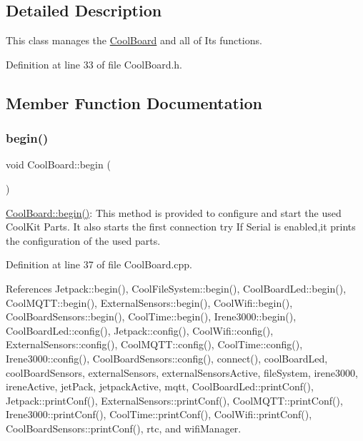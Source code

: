 \subsection{Detailed Description}
This class manages the \hyperlink{classCoolBoard}{Cool\+Board} and all of Its functions. 

Definition at line 33 of file Cool\+Board.\+h.



\subsection{Member Function Documentation}
\mbox{\label{classCoolBoard_acba7c5aef7268b2c0044bdb54d3b9d76}} 
\subsubsection{\texorpdfstring{begin()}{begin()}}
{\footnotesize\ttfamily void Cool\+Board\+::begin (\begin{DoxyParamCaption}{ }\end{DoxyParamCaption})}

\hyperlink{classCoolBoard_acba7c5aef7268b2c0044bdb54d3b9d76}{Cool\+Board\+::begin()}\+: This method is provided to configure and start the used Cool\+Kit Parts. It also starts the first connection try If Serial is enabled,it prints the configuration of the used parts. 

Definition at line 37 of file Cool\+Board.\+cpp.



References Jetpack\+::begin(), Cool\+File\+System\+::begin(), Cool\+Board\+Led\+::begin(), Cool\+M\+Q\+T\+T\+::begin(), External\+Sensors\+::begin(), Cool\+Wifi\+::begin(), Cool\+Board\+Sensors\+::begin(), Cool\+Time\+::begin(), Irene3000\+::begin(), Cool\+Board\+Led\+::config(), Jetpack\+::config(), Cool\+Wifi\+::config(), External\+Sensors\+::config(), Cool\+M\+Q\+T\+T\+::config(), Cool\+Time\+::config(), Irene3000\+::config(), Cool\+Board\+Sensors\+::config(), connect(), cool\+Board\+Led, cool\+Board\+Sensors, external\+Sensors, external\+Sensors\+Active, file\+System, irene3000, irene\+Active, jet\+Pack, jetpack\+Active, mqtt, Cool\+Board\+Led\+::print\+Conf(), Jetpack\+::print\+Conf(), External\+Sensors\+::print\+Conf(), Cool\+M\+Q\+T\+T\+::print\+Conf(), Irene3000\+::print\+Conf(), Cool\+Time\+::print\+Conf(), Cool\+Wifi\+::print\+Conf(), Cool\+Board\+Sensors\+::print\+Conf(), rtc, and wifi\+Manager.


